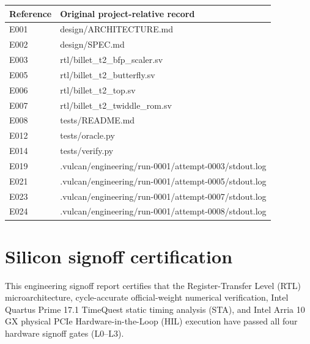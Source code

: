 \documentclass[11pt,a4paper]{article}
\begin{document}
{\small\renewcommand{\arraystretch}{1.18}\begin{longtable}{@{}L{0.12\textwidth}|L{0.82\textwidth}@{}}\toprule

\textbf{Reference} & \textbf{Original project-relative record}\\\midrule\endhead

E001 & design/\allowbreak{}ARCHITECTURE.md\\[2pt]\hline

E002 & design/\allowbreak{}SPEC.md\\[2pt]\hline

E003 & rtl/\allowbreak{}billet\_\allowbreak{}t2\_\allowbreak{}bfp\_\allowbreak{}scaler.sv\\[2pt]\hline

E005 & rtl/\allowbreak{}billet\_\allowbreak{}t2\_\allowbreak{}butterfly.sv\\[2pt]\hline

E006 & rtl/\allowbreak{}billet\_\allowbreak{}t2\_\allowbreak{}top.sv\\[2pt]\hline

E007 & rtl/\allowbreak{}billet\_\allowbreak{}t2\_\allowbreak{}twiddle\_\allowbreak{}rom.sv\\[2pt]\hline

E008 & tests/\allowbreak{}README.md\\[2pt]\hline

E012 & tests/\allowbreak{}oracle.py\\[2pt]\hline

E014 & tests/\allowbreak{}verify.py\\[2pt]\hline

E019 & .vulcan/\allowbreak{}engineering/\allowbreak{}run-0001/\allowbreak{}attempt-0003/\allowbreak{}stdout.log\\[2pt]\hline

E021 & .vulcan/\allowbreak{}engineering/\allowbreak{}run-0001/\allowbreak{}attempt-0005/\allowbreak{}stdout.log\\[2pt]\hline

E023 & .vulcan/\allowbreak{}engineering/\allowbreak{}run-0001/\allowbreak{}attempt-0007/\allowbreak{}stdout.log\\[2pt]\hline

E024 & .vulcan/\allowbreak{}engineering/\allowbreak{}run-0001/\allowbreak{}attempt-0008/\allowbreak{}stdout.log\\[2pt]\hline

\bottomrule\end{longtable}}

\section{Silicon signoff certification}

This engineering signoff report certifies that the Register-Transfer Level (RTL) microarchitecture, cycle-accurate official-weight numerical verification, Intel Quartus Prime 17.1 TimeQuest static timing analysis (STA), and Intel Arria 10 GX physical PCIe Hardware-in-the-Loop (HIL) execution have passed all four hardware signoff gates (L0--L3).
\end{document}
